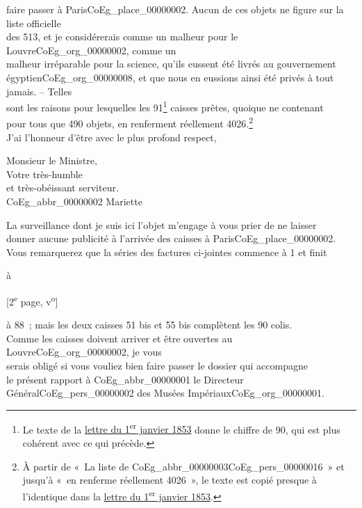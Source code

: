 \documentclass{book}
\begin{document}
faire passer à Paris\gls{CoEg_place_00000002}. Aucun de ces objets ne figure sur la liste officielle\\
des 513, et je considérerais comme un malheur pour le Louvre\gls{CoEg_org_00000002}, comme un\\
malheur irréparable pour la science, qu’ils eussent été livrés au gouvernement\\
égyptien\gls{CoEg_org_00000008}, et que nous en eussions ainsi été privés à tout jamais. – Telles\\
sont les raisons pour lesquelles les 91\footnote{Le texte de la \hyperlink{CoEg_Mariette_1853-01-01}{lettre du 1\textsuperscript{er} janvier 1853} donne le chiffre de 90, qui est plus cohérent avec ce qui précède.} caisses prêtes, quoique ne contenant\\
pour tous que 490 objets, en renferment réellement 4026.\footnote{À partir de «~La liste de \gls{CoEg_abbr_00000003}\gls{CoEg_pers_00000016}~» et jusqu'à «~en renferme réellement 4026~», le texte est copié presque à l'identique dans la \hyperlink{CoEg_Mariette_1853-01-01}{lettre du 1\textsuperscript{er} janvier 1853}.}\\
\indent J’ai l’honneur d’être avec le plus profond respect,\\
\begin{center}Monsieur le Ministre,\\
\hspace{5cm} Votre très-humble\\
\hspace{5cm} et très-obéissant serviteur.\\
\hspace{5cm} \gls{CoEg_abbr_00000002} Mariette\end{center}
\indent La surveillance dont je suis ici l’objet m’engage à vous prier de ne laisser\\
donner aucune publicité à l’arrivée des caisses à Paris\gls{CoEg_place_00000002}.\\
\indent Vous remarquerez que la séries des factures ci-jointes commence à 1 et finit
\begin{flushright}à\end{flushright}
{\footnotesize\begin{center} {[2\textsuperscript{e} page, v\textsuperscript{o}]}\end{center}}
\noindent à 88~; mais les deux caisses 51 bis et 55 bis complètent les 90 colis.\\
\indent Comme les caisses doivent arriver et être ouvertes au Louvre\gls{CoEg_org_00000002}, je vous\\
serais obligé si vous vouliez bien faire passer le dossier qui accompagne\\
le présent rapport à \gls{CoEg_abbr_00000001} le Directeur Général\gls{CoEg_pers_00000002} des Musées Impériaux\gls{CoEg_org_00000001}.
\hypertarget{CoEg_Mariette_1853-01-01}{}
\end{document}
